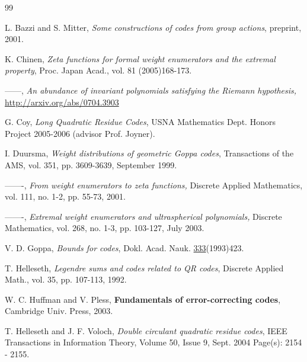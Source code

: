 \documentclass[submission%
]{dmtcs}
\begin{document}
\begin{thebibliography}{99}

 L. Bazzi and S. Mitter,
{\it Some constructions of codes from group actions},
preprint, 2001.

K. Chinen, {\it Zeta functions for formal weight enumerators 
and the extremal property}, Proc. Japan Acad., 
vol. 81 (2005)168-173.

 ------, {\it An abundance of invariant 
polynomials satisfying the Riemann hypothesis,}
\url{http://arxiv.org/abs/0704.3903}


 G. Coy, {\it Long Quadratic Residue Codes},
USNA Mathematics Dept. Honors Project 2005-2006 (advisor Prof. Joyner).

 I. Duursma, {\it Weight distributions of 
geometric Goppa codes}, Transactions of the AMS, vol. 351, 
pp. 3609-3639, September 1999. 

 -------, {\it  From weight enumerators to zeta 
functions,} Discrete Applied Mathematics, vol. 111, no. 1-2, 
pp. 55-73, 2001.


 -------,
{\it Extremal weight enumerators and ultraspherical polynomials,} 
Discrete Mathematics, vol. 268, no. 1-3, pp. 103-127, July 2003.

 V. D. Goppa, {\it Bounds for codes},
Dokl. Acad. Nauk. \underline{333}(1993)423.


 T. Helleseth, {\it Legendre sums and codes related to QR codes}, 
Discrete Applied Math., vol. 35, pp. 107-113, 1992.

 W. C. Huffman and V. Pless,
{\bf Fundamentals of
error-correcting codes}, Cambridge Univ. Press, 2003.

 T. Helleseth and J. F. Voloch,
{\it Double circulant quadratic residue codes},
IEEE Transactions in Information Theory, 
Volume 50, Issue 9, Sept. 2004 Page(s): 2154 - 2155.


\end{thebibliography}
\end{document}
